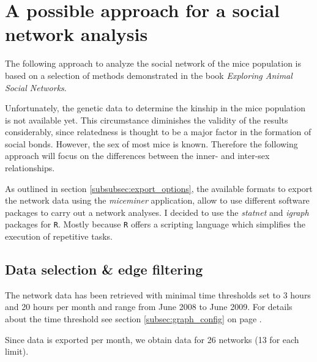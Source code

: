 \section{A possible approach for a social network analysis}
\label{sec:network_analysis}

The following approach to analyze the social network of the mice population is based on a selection of methods demonstrated in the book \textit{Exploring Animal Social Networks}\citep{croft:07}. 

Unfortunately, the genetic data to determine the kinship in the mice population is not available yet. This circumstance diminishes the validity of the results considerably, since relatedness is thought to be a major factor in the formation of social bonds. However, the sex of most mice is known. Therefore the following approach will focus on the differences between the inner- and inter-sex relationships.

As outlined in section \ref{subsubsec:export_options}, the available formats to export the network data using the \textit{miceminer} application, allow to use different software packages to carry out a network analyses. I decided to use the \textit{statnet}\citep{statnet:03} and \textit{igraph}\citep{igraph:06} packages for \lstinline|R|\citep{r:05}. Mostly because \lstinline|R| offers a scripting language which simplifies the execution of repetitive tasks. 


\subsection{Data selection \& edge filtering}
\label{subsec:data_selection}


The network data has been retrieved with minimal time thresholds set to 3 hours and 20 hours per month and range from June 2008 to June 2009. For details about the time threshold see section \ref{subsec:graph_config} on page \pageref{subsec:graph_config}.

Since data is exported per month, we obtain data for 26 networks (13 for each limit).

